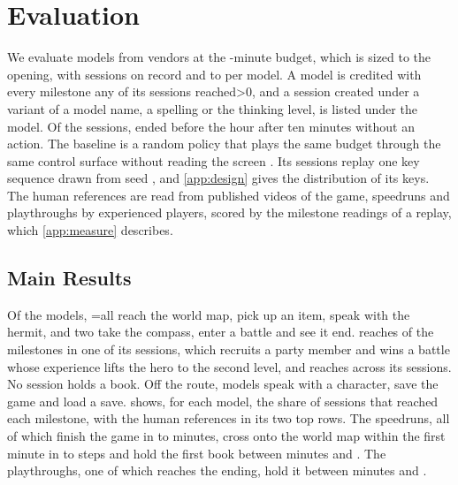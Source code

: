\documentclass{article} %
\begin{document}
\section{Evaluation}
\label{sec:results}

We evaluate \NmodelsDistinct{} models from \Nvendors{} vendors at the
\NbudgetMin{}-minute budget, which is sized to the opening, with \NsessionsPlayed{} sessions on record and \LsessionsMin{} to
\LsessionsMax{} per model. A model is credited with every milestone any of its
sessions reached\ifnum\Naliased>0{}, and a session created under a variant of a model name, a spelling or the thinking level, is listed under the model\fi. Of the \NsessionsPlayed{} sessions, \NidleSessions{} ended before the hour after ten minutes without an action. The baseline is a random policy that plays the same budget through the same control surface without reading the screen \citep{mnih2015humanlevel,hafner2021benchmarking,arc2026arcagi3}. Its \NrandomRuns{} sessions replay one key sequence drawn from seed \QrandomSeed{}, and \cref{app:design} gives the distribution of its keys. The human references are read from published videos of the game, \NhumanSpeedruns{} speedruns and \NhumanPlaythroughs{} playthroughs by experienced players, scored by the milestone readings of a replay, which \cref{app:measure} describes.

\subsection{Main Results}

Of the \Lmodels{} models, \ifnum\Lmap=\Lmodels all \Lmap{}\else\Lmap{}\fi{} reach the world map, \Litem{} pick up an item, \Lhermit{} speak with the hermit, and two take the compass, enter a battle and see it end. \LtopLabel{} reaches \Ltop{} of the \Lrungs{} milestones in one of its \LtopSessions{} sessions, which recruits a party member and wins a battle whose experience lifts the hero to the second level, and \LsecondLabel{} reaches \Lsecond{} across its \LsecondSessions{} sessions. No session holds a book. Off the route, \Ltalk{} models speak with a character, \Lsave{} save the game and \Lload{} load a save.  shows, for each model, the share of sessions that reached each milestone, with the human references in its two top rows. The speedruns, all of which finish the game in \LhumanSpeedCompletionMin{} to \LhumanSpeedCompletionMax{} minutes, cross onto the world map within the first minute in \LhumanSpeedStepsMin{} to \LhumanSpeedStepsMax{} steps and hold the first book between minutes \LhumanSpeedBookFirst{} and \LhumanSpeedBookLast{}. The playthroughs, one of which reaches the ending, hold it between minutes \LhumanPlayBookFirst{} and \LhumanPlayBookLast{}.
\end{document}
